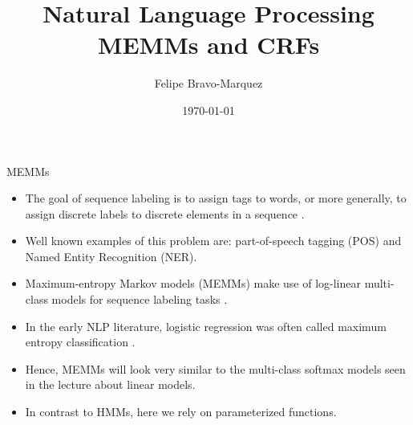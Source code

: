 \documentclass[handout]{beamer}
\title{Natural Language Processing \\ MEMMs and CRFs}
\author[Felipe Bravo Márquez]{\footnotesize
 \textcolor[rgb]{0.00,0.00,1.00}{Felipe Bravo-Marquez}}
\date{\today}
\begin{document}
\begin{frame}
\titlepage


\end{frame}


\begin{frame}{MEMMs}
\begin{scriptsize}
\begin{itemize}

\item The goal of sequence labeling is to assign tags to words, or more generally, to assign discrete labels to discrete elements in a sequence \cite{jacobbook}.

\item Well known examples of this problem are: part-of-speech tagging (POS) and Named Entity Recognition (NER).

\item Maximum-entropy Markov models (MEMMs) make use of log-linear multi-class models for sequence labeling tasks \cite{mccallum2000maximum}.
 
 \item In the early NLP literature, logistic regression was often called maximum entropy classification \cite{jacobbook}.
 
 \item Hence, MEMMs will look very similar to the multi-class softmax models seen in the lecture about linear models. 
 
  \item In contrast to HMMs, here we rely on parameterized functions.

\end{itemize}


\end{scriptsize}
\end{frame}
\end{document}
